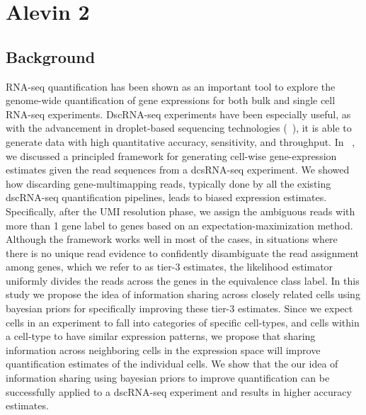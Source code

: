
\chapter{Alevin 2} %

\label{alevin2} %


\section{Background}

RNA-seq quantification has been shown as an important tool to explore the genome-wide
quantification of gene expressions for both bulk and single cell RNA-seq experiments.
DscRNA-seq experiments have been especially useful, as with the advancement in droplet-based 
sequencing technologies (~\citep{dropseq, indrop, tenx}), it is able to generate data with high 
quantitative accuracy, sensitivity, and throughput. In ~, we discussed a 
principled framework for generating cell-wise gene-expression estimates given the read sequences
from a dcsRNA-seq experiment. We showed how discarding gene-multimapping reads, typically done 
by all the existing dscRNA-seq quantification pipelines, leads to biased expression estimates. 
Specifically, after the UMI resolution phase, we assign the ambiguous reads with more than 1 gene label to
genes based on an expectation-maximization method. Although the framework works well in most of the cases, 
in situations where there is no unique read evidence to confidently disambiguate the read assignment
among genes, which we refer to as tier-3 estimates, the likelihood estimator uniformly divides the reads 
across the genes in the equivalence class label. In this study we propose the idea of information sharing across closely 
related cells using bayesian priors for specifically improving these tier-3 estimates. Since we expect cells in an experiment
to fall into categories of specific cell-types, and cells within a cell-type to have similar expression patterns, we propose that
sharing information across neighboring cells in the expression space will improve quantification 
estimates of the individual cells. We show that the our idea of information sharing using bayesian 
priors to improve quantification can be successfully applied to a dscRNA-seq experiment and results in higher accuracy estimates.

